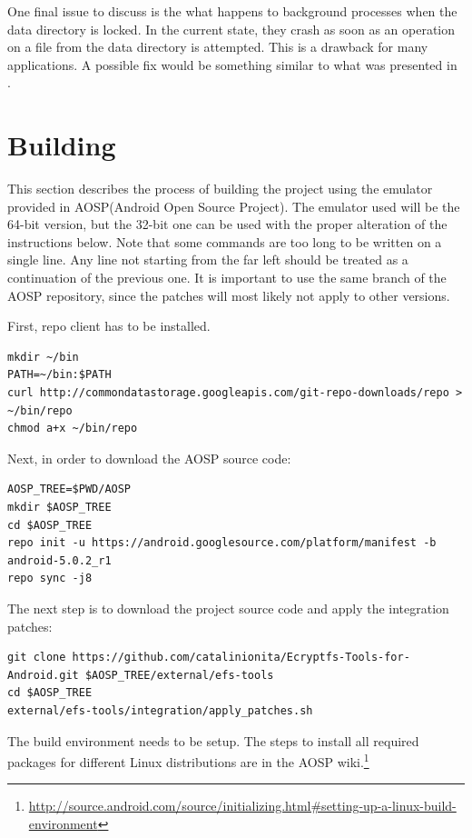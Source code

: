 One final issue to discuss is the what happens to background processes when the data directory is locked. In the current state, they crash as soon as an operation on a file from the data directory is attempted. This is a drawback for many applications. A possible fix would be something similar to what was presented in .

\section{Building}
\label{sec:build-multi-user}

This section describes the process of building the project using the emulator provided in AOSP(Android Open Source Project). The emulator used will be the 64-bit version, but the 32-bit one can be used with the proper alteration of the instructions below. Note that some commands are too long to be written on a single line. Any line not starting from the far left should be treated as a continuation of the previous one. It is important to use the same branch of the AOSP repository, since the patches will most likely not apply to other versions. 

First, repo client has to be installed.

\begin{lstlisting}[numbers=none]
mkdir ~/bin
PATH=~/bin:$PATH
curl http://commondatastorage.googleapis.com/git-repo-downloads/repo > ~/bin/repo
chmod a+x ~/bin/repo
\end{lstlisting}

Next, in order to download the AOSP source code:
\begin{lstlisting}[numbers=none]
AOSP_TREE=$PWD/AOSP
mkdir $AOSP_TREE
cd $AOSP_TREE
repo init -u https://android.googlesource.com/platform/manifest -b android-5.0.2_r1
repo sync -j8
\end{lstlisting}

The next step is to download the project source code and apply the integration patches:
\begin{lstlisting}[numbers=none]
git clone https://github.com/catalinionita/Ecryptfs-Tools-for-Android.git $AOSP_TREE/external/efs-tools
cd $AOSP_TREE
external/efs-tools/integration/apply_patches.sh
\end{lstlisting}

The build environment needs to be setup. The steps to install all required packages for different Linux distributions are in the AOSP wiki.\footnote{\url{http://source.android.com/source/initializing.html\#setting-up-a-linux-build-environment}}


